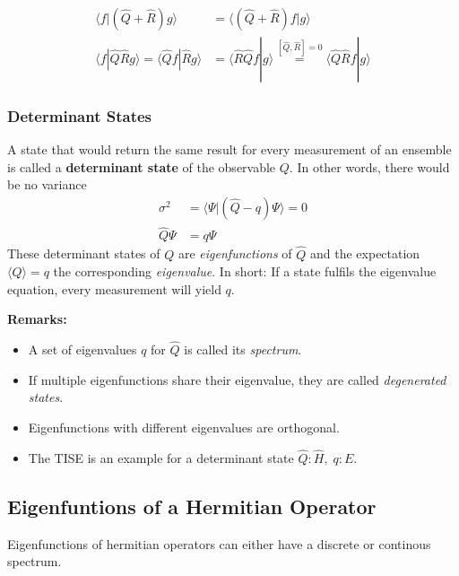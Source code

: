 
\noindent\begin{align*}
    \langle f|(\hat{Q} + \hat{R})g\rangle                                    & = \langle (\hat{Q} + \hat{R})f|g\rangle                                                               \\[0.75em]
    \langle f|\hat{Q}\hat{R}g\rangle       =\langle \hat{Q}f|\hat{R}g\rangle & =  \langle \hat{R}\hat{Q}f|g\rangle \overset{[\hat{Q},\hat{R}]=0}{=} \langle \hat{Q}\hat{R}f|g\rangle
\end{align*}

\subsubsection{Determinant States}
A state that would return the same result for every measurement of an ensemble is called a \textbf{determinant state} of the observable $Q$.
In other words, there would be no variance
\noindent\begin{align*}
    \sigma^2     & = \langle \Psi|(\hat{Q} - q) \Psi\rangle = 0 \\
    \hat{Q} \Psi & = q \Psi
\end{align*}
These determinant states of $Q$ are \textit{eigenfunctions} of $\hat{Q}$ and the expectation $\langle Q\rangle = q$ the corresponding \textit{eigenvalue}.
\newpar{}
In short: If a state fulfils the eigenvalue equation, every measurement will yield $q$.

\textbf{Remarks:}
\begin{itemize}
    \item A set of eigenvalues $q$ for $\hat{Q}$ is called its \textit{spectrum}.
    \item If multiple eigenfunctions share their eigenvalue, they are called \textit{degenerated states}.
    \item Eigenfunctions with different eigenvalues are orthogonal.
    \item The TISE is an example for a determinant state\newline
          $\hat{Q}: \hat{H},\; q:E$.
\end{itemize}

\subsection{Eigenfuntions of a Hermitian Operator}
Eigenfunctions of hermitian operators can either have a discrete or continous spectrum.

